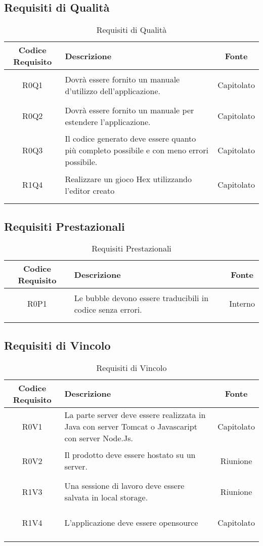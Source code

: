 \documentclass[../AnalisiDeiRequisiti.tex]{subfiles}
\begin{document}
\subsection{Requisiti di Qualità}
\normalsize
\begin{longtable}{|c|>{\centering}p{7cm}|c|}
	\hline
	\textbf{Codice Requisito} & \textbf{Descrizione} & \textbf{Fonte}\\
	\hline
	\endhead
	\hypertarget{R0Q1}{R0Q1} & Dovrà essere fornito un manuale d'utilizzo dell'applicazione. & Capitolato \\ \hline
	\hypertarget{R0Q2}{R0Q2} & Dovrà essere fornito un manuale per estendere l'applicazione. & Capitolato \\ \hline
	\hypertarget{R0Q3}{R0Q3} & Il codice generato deve essere quanto più completo possibile e con meno errori possibile. & Capitolato \\ \hline
	\hypertarget{R1Q4}{R1Q4} & Realizzare un gioco Hex utilizzando l'editor creato & Capitolato \\ \hline
	\caption[Requisiti di Qualità]{Requisiti di Qualità}
	\label{tabella:req1}
\end{longtable}
\clearpage
\subsection{Requisiti Prestazionali}
\normalsize
\begin{longtable}{|c|>{\centering}p{7cm}|c|}
	\hline
	\textbf{Codice Requisito} & \textbf{Descrizione} & \textbf{Fonte}\\
	\hline
	\endhead
	\hypertarget{R0P1}{R0P1} & Le bubble devono essere traducibili in codice senza errori. & Interno \\ \hline
	\caption[Requisiti Prestazionali]{Requisiti Prestazionali}
	\label{tabella:req2}
\end{longtable}
\clearpage
\subsection{Requisiti di Vincolo}
\normalsize
\begin{longtable}{|c|>{\centering}p{7cm}|c|}
	\hline
	\textbf{Codice Requisito} & \textbf{Descrizione} & \textbf{Fonte}\\
	\hline
	\endhead
	\hypertarget{R0V1}{R0V1} & La parte server deve essere realizzata in Java con server Tomcat o Javascaript con server Node.Js. & Capitolato \\ \hline
	\hypertarget{R0V2}{R0V2} & Il prodotto deve essere hostato su un server. & Riunione \\ \hline
	\hypertarget{R1V3}{R1V3} & Una sessione di lavoro deve essere salvata in local storage. & Riunione \\ \hline
	\hypertarget{R1V4}{R1V4} & L'applicazione deve essere opensource
	& Capitolato \\ \hline
	\caption[Requisiti di Vincolo]{Requisiti di Vincolo}
	\label{tabella:req3}
\end{longtable}
\clearpage
\end{document}
